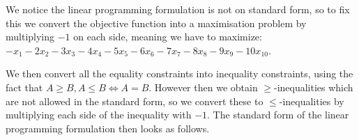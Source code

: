 \documentclass[11pt,a4paper,english]{article}
\begin{document}
We notice the linear programming formulation is not on standard form,         
so to fix this we convert the objective function into a maximisation          
problem by multiplying $-1$ on each side, meaning we have to maximize:        
$-x_1-2x_2-3x_3-4x_4-5x_5-6x_6-7x_7-8x_8-9x_9-10x_{10}$.                      

We then convert all the equality constraints into inequality constraints,     
using the fact that $A \geq B, A \leq B \Leftrightarrow A = B$. However then  
we obtain $\geq$-inequalities which are not allowed in the standard form,     
so we convert these to $\leq$-inequalities by multiplying each side of the    
inequality with $-1$. The standard form of the linear programming formulation 
then looks as follows.                                                        
\end{document}
